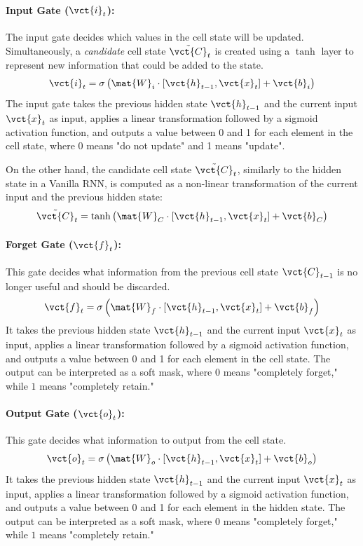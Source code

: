 \paragraph{Input Gate ($\vct{i}_t$):}
The input gate decides which values in the cell state will be updated.
Simultaneously, a \textit{candidate} cell state $\tilde{\vct{C}}_t$ is created using a $\tanh$ layer to represent new information that could be added to the state.
\begin{equation}
    \vct{i}_t = \sigma\left(\mat{W}_i \cdot [\vct{h}_{t-1}, \vct{x}_t] + \vct{b}_i\right)
\end{equation}
The input gate takes the previous hidden state $\vct{h}_{t-1}$ and the current input $\vct{x}_t$ as input, applies a linear transformation followed by a sigmoid activation function,
and outputs a value between 0 and 1 for each element in the cell state, where 0 means "do not update" and 1 means "update".

On the other hand, the candidate cell state $\tilde{\vct{C}}_t$, similarly to the hidden state in a Vanilla RNN,
is computed as a non-linear transformation of the current input and the previous hidden state:
\begin{equation}
    \tilde{\vct{C}}_t = \tanh\left(\mat{W}_C \cdot [\vct{h}_{t-1}, \vct{x}_t] + \vct{b}_C\right)
\end{equation}

\paragraph{Forget Gate ($\vct{f}_t$):}
This gate decides what information from the previous cell state $\vct{C}_{t-1}$ is no longer useful and should be discarded.
\begin{equation}
    \vct{f}_t = \sigma\left(\mat{W}_f \cdot [\vct{h}_{t-1}, \vct{x}_t] + \vct{b}_f\right)
\end{equation}
It takes the previous hidden state $\vct{h}_{t-1}$ and the current input $\vct{x}_t$ as input, applies a linear transformation followed by a sigmoid activation function,
and outputs a value between 0 and 1 for each element in the cell state.
The output can be interpreted as a soft mask, where $0$ means "completely forget," while $1$ means "completely retain."

\paragraph{Output Gate ($\vct{o}_t$):}
This gate decides what information to output from the cell state.
\begin{equation}
    \vct{o}_t = \sigma\left(\mat{W}_o \cdot [\vct{h}_{t-1}, \vct{x}_t] + \vct{b}_o\right)
\end{equation}
It takes the previous hidden state $\vct{h}_{t-1}$ and the current input $\vct{x}_t$ as input, applies a linear transformation followed by a sigmoid activation function,
and outputs a value between 0 and 1 for each element in the hidden state.
The output can be interpreted as a soft mask, where $0$ means "completely forget," while $1$ means "completely retain."

